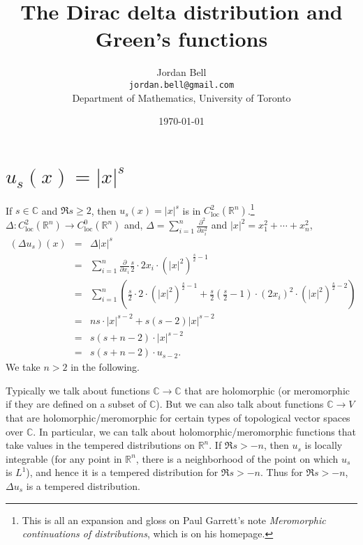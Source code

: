 \documentclass{article}
\begin{document}
\title{The Dirac delta distribution and Green's functions}
\author{Jordan Bell\\ \texttt{jordan.bell@gmail.com}\\Department of Mathematics, University of Toronto}
\date{\today}

\maketitle

\section{$u_s(x)=|x|^s$}
If $s \in \mathbb{C}$ and $\Re s \geq 2$, then $u_s(x)=|x|^s$ is in $C^2_{\textrm{loc}}(\mathbb{R}^n)$.\footnote{This is all an expansion and gloss on Paul Garrett's note {\em Meromorphic continuations of distributions}, which is on his homepage. }  $\Delta:C^2_{\textrm{loc}}(\mathbb{R}^n) \to 
C^0_{\textrm{loc}}(\mathbb{R}^n)$ and, $\Delta=\sum_{i=1}^n \frac{\partial^2}{\partial x_i^2}$
and $|x|^2=x_1^2+\cdots+x_n^2$,
\begin{eqnarray*}
(\Delta u_s)(x) &=& \Delta |x|^s\\
&=& \sum_{i=1}^n \frac{\partial}{\partial x_i} \frac{s}{2} \cdot 2x_i \cdot (|x|^2)^{\frac{s}{2}-1}\\
&=&\sum_{i=1}^n \left( \frac{s}{2}\cdot 2\cdot(|x|^2)^{\frac{s}{2}-1}+ \frac{s}{2}\left(\frac{s}{2}-1\right)\cdot (2x_i)^2 \cdot(|x|^2)^{\frac{s}{2}-2}\right)\\
&=&ns\cdot |x|^{s-2}+s(s-2)|x|^{s-2}\\
&=& s(s+n-2) \cdot |x|^{s-2}\\
&=&s(s+n-2)\cdot u_{s-2}.
\end{eqnarray*}
We take $n >2$ in the following. 

Typically we talk about functions $\mathbb{C} \to \mathbb{C}$ that are holomorphic (or meromorphic if they are defined on a subset of $\mathbb{C}$). 
But we can also talk about functions $\mathbb{C} \to V$ that are holomorphic/meromorphic for certain types of topological vector spaces over $\mathbb{C}$. 
In particular, we can talk about holomorphic/meromorphic functions that take values in the tempered distributions on $\mathbb{R}^n$. 
If $\Re s>-n$, then $u_s$ is locally integrable (for any point in $\mathbb{R}^n$, there is a neighborhood of the point on which $u_s$ is $L^1$), and hence
it is a tempered distribution for $\Re s > -n$.
Thus for $\Re s >-n$, $\Delta u_s$ is a tempered distribution. 
\end{document}

